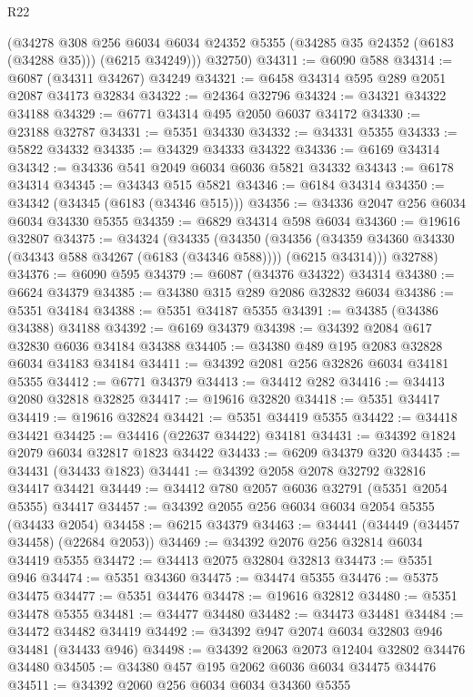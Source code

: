 \begin{lexlean}{R22}
\begin{coremodule}
        (@34278
          @308
          @256
          @6034
          @6034
          @24352
          @5355
          (@34285 @35 @24352 (@6183 (@34288 @35)))
          (@6215 @34249)))
      @32750)
@34311 := @6090 @588
@34314 := @6087 (@34311 @34267) @34249
@34321 := @6458 @34314 @595 @289 @2051 @2087 @34173 @32834
@34322 := @24364 @32796
@34324 := @34321 @34322 @34188
@34329 := @6771 @34314 @495 @2050 @6037 @34172
@34330 := @23188 @32787
@34331 := @5351 @34330
@34332 := @34331 @5355
@34333 := @5822 @34332
@34335 := @34329 @34333 @34322
@34336 := @6169 @34314
@34342 := @34336 @541 @2049 @6034 @6036 @5821 @34332
@34343 := @6178 @34314
@34345 := @34343 @515 @5821
@34346 := @6184 @34314
@34350 := @34342 (@34345 (@6183 (@34346 @515)))
@34356 := @34336 @2047 @256 @6034 @6034 @34330 @5355
@34359 := @6829 @34314 @598 @6034
@34360 := @19616 @32807
@34375 := @34324
    (@34335
      (@34350
        (@34356 (@34359 @34360 @34330 (@34343 @588 @34267 (@6183 (@34346 @588)))) (@6215 @34314)))
      @32788)
@34376 := @6090 @595
@34379 := @6087 (@34376 @34322) @34314
@34380 := @6624 @34379
@34385 := @34380 @315 @289 @2086 @32832 @6034
@34386 := @5351 @34184
@34388 := @5351 @34187 @5355
@34391 := @34385 (@34386 @34388) @34188
@34392 := @6169 @34379
@34398 := @34392 @2084 @617 @32830 @6036 @34184 @34388
@34405 := @34380 @489 @195 @2083 @32828 @6034 @34183 @34184
@34411 := @34392 @2081 @256 @32826 @6034 @34181 @5355
@34412 := @6771 @34379
@34413 := @34412 @282
@34416 := @34413 @2080 @32818 @32825
@34417 := @19616 @32820
@34418 := @5351 @34417
@34419 := @19616 @32824
@34421 := @5351 @34419 @5355
@34422 := @34418 @34421
@34425 := @34416 (@22637 @34422) @34181
@34431 := @34392 @1824 @2079 @6034 @32817 @1823 @34422
@34433 := @6209 @34379 @320
@34435 := @34431 (@34433 @1823)
@34441 := @34392 @2058 @2078 @32792 @32816 @34417 @34421
@34449 := @34412 @780 @2057 @6036 @32791 (@5351 @2054 @5355) @34417
@34457 := @34392 @2055 @256 @6034 @6034 @2054 @5355 (@34433 @2054)
@34458 := @6215 @34379
@34463 := @34441 (@34449 (@34457 @34458) (@22684 @2053))
@34469 := @34392 @2076 @256 @32814 @6034 @34419 @5355
@34472 := @34413 @2075 @32804 @32813
@34473 := @5351 @946
@34474 := @5351 @34360
@34475 := @34474 @5355
@34476 := @5375 @34475
@34477 := @5351 @34476
@34478 := @19616 @32812
@34480 := @5351 @34478 @5355
@34481 := @34477 @34480
@34482 := @34473 @34481
@34484 := @34472 @34482 @34419
@34492 := @34392 @947 @2074 @6034 @32803 @946 @34481 (@34433 @946)
@34498 := @34392 @2063 @2073 @12404 @32802 @34476 @34480
@34505 := @34380 @457 @195 @2062 @6036 @6034 @34475 @34476
@34511 := @34392 @2060 @256 @6034 @6034 @34360 @5355

\end{coremodule}
\end{lexlean}
